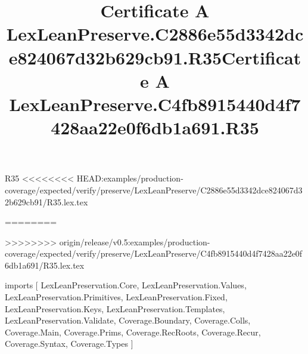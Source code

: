 \begin{lexlean}{R35}
<<<<<<<< HEAD:examples/production-coverage/expected/verify/preserve/LexLeanPreserve/C2886e55d3342dce824067d32b629cb91/R35.lex.tex
\title{Certificate A LexLeanPreserve.C2886e55d3342dce824067d32b629cb91.R35}
========
\title{Certificate A LexLeanPreserve.C4fb8915440d4f7428aa22e0f6db1a691.R35}
>>>>>>>> origin/release/v0.5:examples/production-coverage/expected/verify/preserve/LexLeanPreserve/C4fb8915440d4f7428aa22e0f6db1a691/R35.lex.tex
\begin{coremodule}
imports [
  LexLeanPreservation.Core,
  LexLeanPreservation.Values,
  LexLeanPreservation.Primitives,
  LexLeanPreservation.Fixed,
  LexLeanPreservation.Keys,
  LexLeanPreservation.Templates,
  LexLeanPreservation.Validate,
  Coverage.Boundary,
  Coverage.Colls,
  Coverage.Main,
  Coverage.Prims,
  Coverage.RecRoots,
  Coverage.Recur,
  Coverage.Syntax,
  Coverage.Types
]


\end{coremodule}
\end{lexlean}
